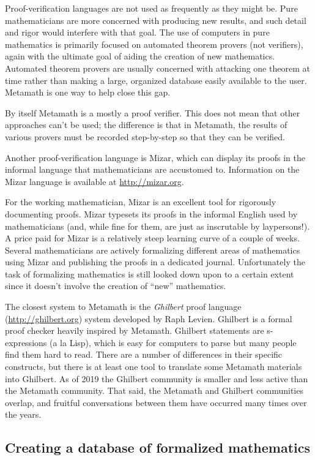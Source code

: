Proof-verification languages are not used as frequently as they might be.
Pure mathematicians are more concerned with producing new results, and such
detail and rigor would interfere with that goal.  The use of computers in pure
mathematics is primarily focused on automated theorem provers (not verifiers),
again with the ultimate goal of aiding the creation of new mathematics.
Automated theorem provers are usually concerned with attacking one theorem at
time rather than making a large, organized database easily available to the
user.  Metamath is one way to help close this gap.

By itself Metamath is a mostly a proof verifier.
This does not mean that other approaches can't be used; the difference
is that in Metamath, the results of various provers must be recorded
step-by-step so that they can be verified.

Another proof-verification language is Mizar, which can display
its proofs in the informal language that mathematicians are accustomed to.
Information on the Mizar language is available at \url{http://mizar.org}.

For the working mathematician, Mizar is an excellent tool for rigorously
documenting proofs. Mizar typesets its proofs in the informal English used by
mathematicians (and, while fine for them, are just as inscrutable by
laypersons!). A price paid for Mizar is a relatively steep learning curve of a
couple of weeks.  Several mathematicians are actively formalizing different
areas of mathematics using Mizar and publishing the proofs in a dedicated
journal. Unfortunately the task of formalizing mathematics is still looked
down upon to a certain extent since it doesn't involve the creation of ``new''
mathematics.

The closest system to Metamath is
the {\em Ghilbert} proof language (\url{http://ghilbert.org})
system developed by
Raph Levien.
Ghilbert is a formal proof checker heavily inspired by Metamath.
Ghilbert statements are s-expressions (a la Lisp), which is easy
for computers to parse but many people find them hard to read.
There are a number of differences in their specific constructs, but
there is at least one tool to translate some Metamath materials into Ghilbert.
As of 2019 the Ghilbert community is smaller and less active than the
Metamath community.
That said, the Metamath and Ghilbert communities overlap, and fruitful
conversations between them have occurred many times over the years.

\subsection{Creating a database of formalized mathematics}\label{mathdatabase}

